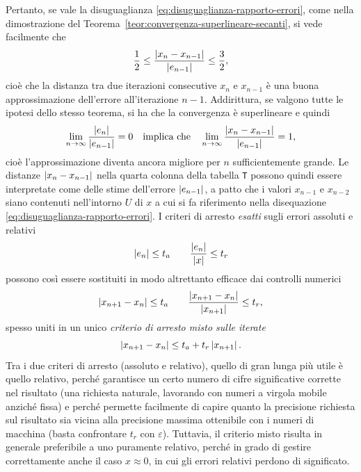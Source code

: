 \noindent Pertanto, se vale la disuguaglianza
\eqref{eq:disuguaglianza-rapporto-errori}, come nella dimostrazione del
Teorema~\ref{teor:convergenza-superlineare-secanti},
si vede facilmente che
\[
\frac{1}{2} \leq \frac{\left\lvert x_n-x_{n-1}\right\rvert}{\left\lvert e_{n-1}\right\rvert} \leq \frac{3}{2},
\]
cioè che la distanza tra due iterazioni consecutive $x_n$ e $x_{n-1}$
è una buona approssimazione dell'errore all'iterazione $n-1$.
Addirittura, se valgono tutte le ipotesi dello stesso teorema, si ha che
la convergenza è superlineare e quindi
\begin{equation} \label{eq:approssimazione-errore}
\lim_{n \to \infty} \frac{\left\lvert e_n\right\rvert}{\left\lvert e_{n-1}\right\rvert} = 0
\quad \text{implica che} \quad
\lim_{n \to \infty} \frac{\left\lvert x_n-x_{n-1}\right\rvert}{\left\lvert e_{n-1}\right\rvert} = 1,
\end{equation}
cioè l'approssimazione diventa ancora migliore per $n$ sufficientemente grande.
Le distanze $\left\lvert x_n-x_{n-1}\right\rvert$ nella quarta colonna della tabella \texttt{T}
possono quindi essere interpretate come delle stime dell'errore $\left\lvert e_{n-1}\right\rvert$,
a patto che i valori $x_{n-1}$ e $x_{n-2}$ siano contenuti
nell'intorno $U$ di $x$ a cui si fa riferimento nella disequazione
\eqref{eq:disuguaglianza-rapporto-errori}.
I criteri di arresto \emph{esatti} sugli errori assoluti e relativi
\[
\left\lvert e_n\right\rvert \leq t_a
\qquad \frac{\left\lvert e_n\right\rvert}{\left\lvert x\right\rvert} \leq t_r
\]
possono così essere sostituiti in modo altrettanto efficace dai controlli numerici
\[
\left\lvert x_{n+1}-x_n\right\rvert \leq t_a
\qquad \frac{\left\lvert x_{n+1}-x_n\right\rvert}{\left\lvert x_{n+1}\right\rvert} \leq t_r,
\]
spesso uniti in un unico \emph{criterio di arresto misto sulle iterate}
\[
\left\lvert x_{n+1}-x_n\right\rvert \leq t_a + t_r \left\lvert x_{n+1}\right\rvert.
\]
Tra i due criteri di arresto (assoluto e relativo), quello di gran lunga
più utile è quello relativo, perché garantisce un certo numero
di cifre significative corrette nel risultato (una richiesta naturale,
lavorando con numeri a virgola mobile anziché fissa) e perché permette
facilmente di capire quanto la precisione richiesta sul risultato
sia vicina alla precisione massima ottenibile con i numeri di macchina
(basta confrontare $t_r$ con $\varepsilon$).
Tuttavia, il criterio misto risulta in generale preferibile
a uno puramente relativo, perché in grado di gestire correttamente
anche il caso $x \approx 0$, in cui gli errori relativi perdono
di significato.

